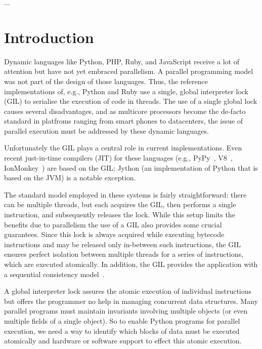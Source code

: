 \documentclass{sigplanconf}
\begin{document}
\keywords
...

\section{Introduction}


Dynamic languages like Python, PHP, Ruby, and JavaScript receive a lot of attention but
have not yet embraced parallelism. A parallel programming model was not part of the design
of those languages. Thus, the reference implementations of, e.g., Python and Ruby use a
single, global interpreter lock (GIL) to serialise the execution of code in threads. The
use of a single global lock causes several disadvantages, and as multicore processors
become the de-facto standard in platfroms ranging from smart phones to datacenters, the
issue of parallel execution must be addressed by these dynamic languages.

Unfortunately the GIL plays a central role in current implementations. Even
recent just-in-time compilers (JIT) for these languages
(e.g., PyPy~\cite{cfbolz09}, V8~\cite{kevin10}, IonMonkey~\cite{ionmonkey})
are based on the GIL; Jython (an implementation of Python that is based on the JVM) is a
notable exception.

The standard model employed in these systems is fairly straightforward: there can be
multiple threads, but each acquires the GIL, then performs a single instruction, and
subsequently releases the lock.
While this setup limits the benefits due to parallelism
the use of a GIL also provides some crucial guarantees. Since this lock is always acquired
while executing bytecode instructions and may be released only in-between such
instructions, the GIL ensures perfect isolation between multiple threads for a series of
instructions, which are executed atomically.  In addition, the GIL provides the
application with a sequential consistency model~\cite{lamport79}.

A global interpreter lock assures the atomic execution of individual instructions but
offers the programmer no help in managing concurrent data structures. Many parallel
programs must maintain invariants involving multiple objects (or even multiple fields of a
single object).  So to enable Python programs for parallel execution, we need a way to
identify which blocks of data must be executed atomically and hardware or software support
to effect this atomic execution.
\end{document}
